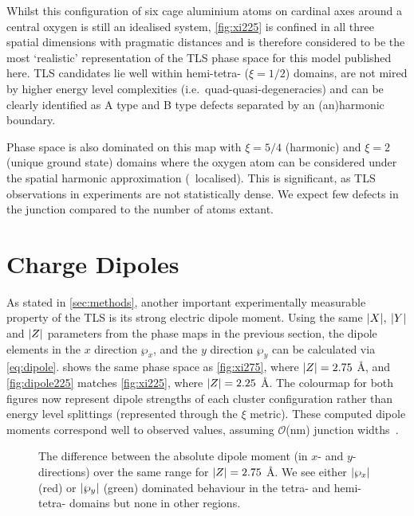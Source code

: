 Whilst this configuration of six cage aluminium atoms on cardinal axes around a central oxygen is still an idealised system, \cref{fig:xi225} is confined in all three spatial dimensions with pragmatic distances and is therefore considered to be the most `realistic' representation of the TLS phase space for this model published here.
TLS candidates lie well within hemi-tetra- ($\xi=1/2$) domains, are not mired by higher energy level complexities (i.e.\ quad-quasi-degeneracies) and can be clearly identified as A type and B type defects separated by an (an)harmonic boundary.

Phase space is also dominated on this map with $\xi=5/4$ (harmonic) and $\xi=2$ (unique ground state) domains where the oxygen atom can be considered under the spatial harmonic approximation (\ie\ localised).
This is significant, as TLS observations in experiments are not statistically dense.
We expect few defects in the junction compared to the number of atoms extant.

\section{Charge Dipoles}\label{sec:dipole}

As stated in \cref{sec:methods}, another important experimentally measurable property of the TLS is its strong electric dipole moment.
Using the same $\lvert X\rvert, \: \lvert Y\rvert$ and $\lvert Z\rvert$ parameters from the phase maps in the previous section, the dipole elements in the $x$ direction $\wp_x$, and the $y$ direction $\wp_y$ can be calculated via \cref{eq:dipole}.
 shows the same phase space as \cref{fig:xi275}, where $\lvert Z\rvert = 2.75$ \AA, and \cref{fig:dipole225} matches \cref{fig:xi225}, where $\lvert Z\rvert = 2.25$ \AA.
The colourmap for both figures now represent dipole strengths of each cluster configuration rather than energy level splittings (represented through the $\xi$ metric).
These computed dipole moments correspond well to observed values, assuming $\mathcal{O}$(nm) junction widths~\cite{Martinis2005, Cole2010}.

\begin{figure}[htp]
  \caption[fig13]{\label{fig:dipole275}The difference between the absolute dipole moment (in $x$- and $y$-directions) over the same range for $\lvert Z\rvert = 2.75$ \AA. We see either $\lvert\wp_x\rvert$ (red) or $\lvert\wp_y\rvert$ (green) dominated behaviour in the tetra- and hemi-tetra- domains but none in other regions.}
\end{figure}


